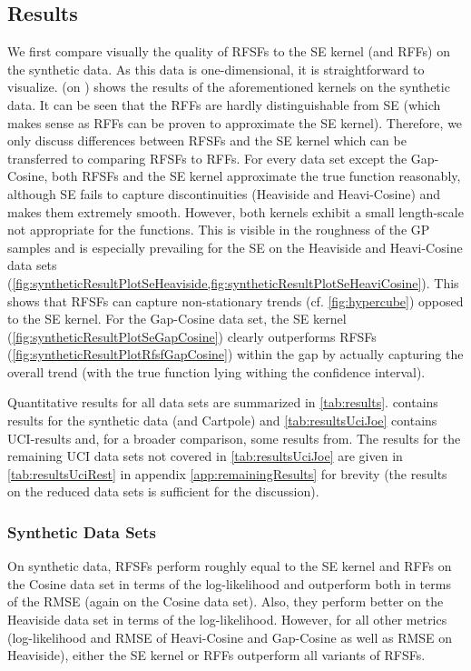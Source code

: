 \subsection{Results}  \label{subsec:results}
	We first compare visually the quality of \acp{RFSF} to the \ac{SE} kernel (and \acp{RFF}) on the synthetic data.
	As this data is one-dimensional, it is straightforward to visualize.
	 (on ) shows the results of the aforementioned kernels on the synthetic data.
	It can be seen that the \acp{RFF} are hardly distinguishable from \ac{SE} (which makes sense as \acp{RFF} can be proven to approximate the \ac{SE} kernel).
	Therefore, we only discuss differences between \acp{RFSF} and the \ac{SE} kernel which can be transferred to comparing \acp{RFSF} to \acp{RFF}.
	For every data set except the Gap-Cosine, both \acp{RFSF} and the \ac{SE} kernel approximate the true function reasonably, although \ac{SE} fails to capture discontinuities (Heaviside and Heavi-Cosine) and makes them extremely smooth.
	However, both kernels exhibit a small length-scale not appropriate for the functions.
	This is visible in the roughness of the \ac{GP} samples and is especially prevailing for the \ac{SE} on the Heaviside and Heavi-Cosine data sets (\cref{fig:syntheticResultPlotSeHeaviside,fig:syntheticResultPlotSeHeaviCosine}).
	This shows that \acp{RFSF} can capture non-stationary trends (cf. \cref{fig:hypercube}) opposed to the \ac{SE} kernel.
	For the Gap-Cosine data set, the \ac{SE} kernel (\cref{fig:syntheticResultPlotSeGapCosine}) clearly outperforms \acp{RFSF} (\cref{fig:syntheticResultPlotRfsfGapCosine}) within the gap by actually capturing the overall trend (with the true function lying withing the confidence interval).

	Quantitative results for all data sets are summarized in \cref{tab:results}.
	 contains results for the synthetic data (and Cartpole) and \cref{tab:resultsUciJoe} contains \ac{UCI}-results and, for a broader comparison, some results from\cite{watsonLatentDerivativeBayesian2021}.
	The results for the remaining \ac{UCI} data sets not covered in \cref{tab:resultsUciJoe} are given in \cref{tab:resultsUciRest} in appendix \cref{app:remainingResults} for brevity (the results on the reduced data sets is sufficient for the discussion).

	\subsubsection{Synthetic Data Sets}
		On synthetic data, \acp{RFSF} perform roughly equal to the \ac{SE} kernel and \acp{RFF} on the Cosine data set in terms of the log-likelihood and outperform both in terms of the \ac{RMSE} (again on the Cosine data set).
		Also, they perform better on the Heaviside data set in terms of the log-likelihood.
		However, for all other metrics (log-likelihood and \ac{RMSE} of Heavi-Cosine and Gap-Cosine as well as \ac{RMSE} on Heaviside), either the \ac{SE} kernel or \acp{RFF} outperform all variants of \acp{RFSF}.

